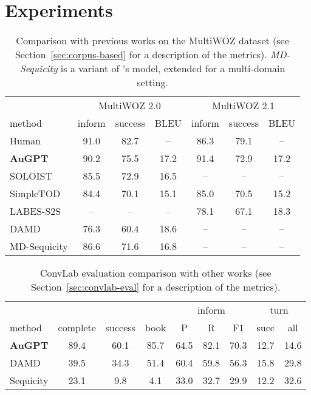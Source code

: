 \documentclass[11pt,a4paper]{article}
\newcommand{\Augpt}[0]{AuGPT\xspace}
\begin{document}
\section{Experiments}
\label{sec:experiments}
\begin{table*}[htbp]
    \centering
    \begin{tabular}{l|ccc|ccc}
      \toprule
      & \multicolumn{3}{c|}{MultiWOZ 2.0} & \multicolumn{3}{c}{MultiWOZ 2.1} \\
      method & inform & success & BLEU & inform & success & BLEU \\
      \midrule
      Human & 91.0 & 82.7 & -- & 86.3 & 79.1 & -- \\
      \midrule
      \textbf{\Augpt} & 90.2 & 75.5 & 17.2 & 91.4 & 72.9 & 17.2 \\
      SOLOIST \cite{peng2020} & 85.5 & 72.9 & 16.5 & -- & -- & -- \\
      SimpleTOD \cite{hosseini2020} & 84.4 & 70.1 & 15.1 & 85.0 & 70.5 & 15.2 \\
      LABES-S2S \cite{zhang2020end2end} & -- & -- & -- & 78.1 & 67.1 & 18.3 \\
      DAMD \cite{zhang2019} & 76.3 & 60.4 & 18.6 & -- & -- & -- \\
      MD-Sequicity \cite{zhang2019} & 86.6 & 71.6 & 16.8 & -- & -- & -- \\
      \bottomrule
  \end{tabular}
  \caption{Comparison with previous works on the MultiWOZ dataset (see Section~\ref{sec:corpus-based} for a description of the metrics). \emph{MD-Sequicity} is a variant of \citet{lei2018}'s model, extended for a multi-domain setting.}
  \label{tab:multiwoz_sota_comparison}
\end{table*}
\begin{table*}[htbp]
    \centering
    \begin{tabular}{l|ccc|ccc|cc}
      \toprule
       &  & & & \multicolumn{3}{c|}{inform} & \multicolumn{2}{c}{turn} \\
      method & complete & success & book & P & R & F1 & succ & all \\
      \midrule
      \textbf{\Augpt} & 89.4 & 60.1 & 85.7 & 64.5 & 82.1 & 70.3 & 12.7 & 14.6 \\
      DAMD \cite{zhang2019} & 39.5 & 34.3 & 51.4 & 60.4 & 59.8 & 56.3 & 15.8 & 29.8\\
      Sequicity \cite{lei2018} & 23.1 & \phantom{0}9.8 & \phantom{0}4.1 & 33.0 & 32.7 & 29.9 & 12.2 & 32.6 \\
      \bottomrule
  \end{tabular}
  \caption{ConvLab evaluation comparison with other works (see Section~\ref{sec:convlab-eval} for a description of the metrics).}
  \label{tab:multiwoz_convlab_comparison}
\end{table*}
\end{document}
